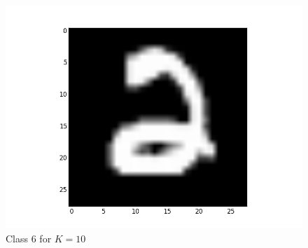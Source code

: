 \documentclass[submit]{harvardml}
\begin{document}
\begin{figure}[ht]
    \includegraphics[scale=0.20]{representative-5-2}
    \caption{Class 6 for $K=10$}
\end{figure}
\end{document}
